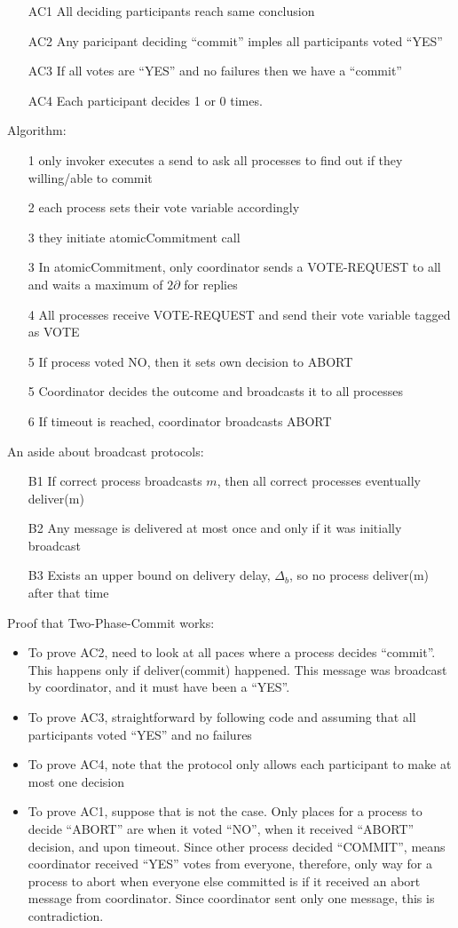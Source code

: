 \documentclass[a4paper,10pt,]{article}
\begin{document}
\begin{itemize}
  \item[AC1] All deciding participants reach same conclusion
  \item[AC2] Any paricipant deciding ``commit'' imples all participants voted ``YES''
  \item[AC3] If all votes are ``YES'' and no failures then we have a ``commit''
  \item[AC4] Each participant decides 1 or 0 times.
\end{itemize}
Algorithm:
\begin{itemize}
  \item[1] only invoker executes a send to ask all processes to find out if they willing/able to commit
  \item[2] each process sets their vote variable accordingly
  \item[3] they initiate atomicCommitment call
  \item[3] In atomicCommitment, only coordinator sends a VOTE-REQUEST to all and waits a maximum of $2\partial$ for replies
  \item[4] All processes receive VOTE-REQUEST and send their vote variable tagged as VOTE
  \item[5] If process voted NO, then it sets own decision to ABORT
  \item[5] Coordinator decides the outcome and broadcasts it to all processes
  \item[6] If timeout is reached, coordinator broadcasts ABORT
\end{itemize}
An aside about broadcast protocols:
\begin{itemize}
  \item[B1] If correct process broadcasts $m$, then all correct processes eventually deliver(m)
  \item[B2] Any message is delivered at most once and only if it was initially broadcast
  \item[B3] Exists an upper bound on delivery delay, $\Delta_b$, so no process deliver(m) after that time
\end{itemize}
Proof that Two-Phase-Commit works:  
\begin{itemize}
  \item To prove AC2, need to look at all paces where a process decides ``commit''.  This happens only if deliver(commit) happened.  This message was broadcast by coordinator, and it must have been a ``YES''.  
  \item To prove AC3, straightforward by following code and assuming that all participants voted ``YES'' and no failures
  \item To prove AC4, note that the protocol only allows each participant to make at most one decision
  \item To prove AC1, suppose that is not the case.  Only places for a process to decide ``ABORT'' are when it voted ``NO'', when it received ``ABORT'' decision, and upon timeout.  Since other process decided ``COMMIT'', means coordinator received ``YES'' votes from everyone, therefore, only way for a process to abort when everyone else committed is if it received an abort message from coordinator.  Since coordinator sent only one message, this is contradiction.
\end{itemize}
\end{document}
